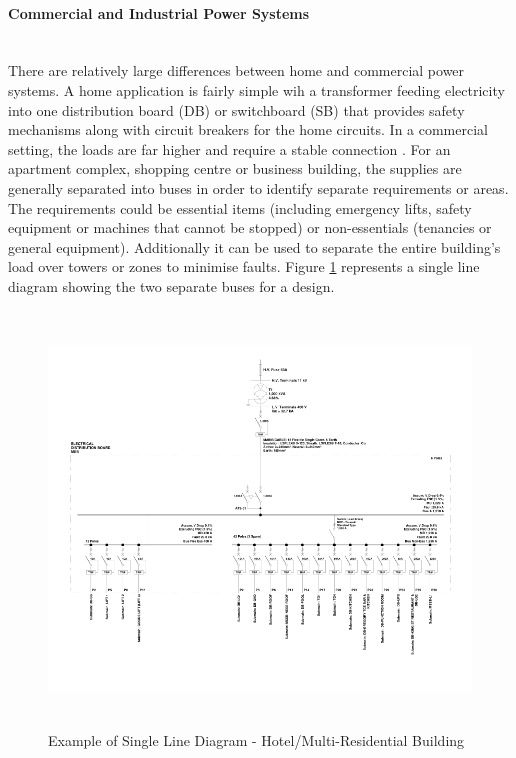 \paragraph{Commercial and Industrial Power Systems}
~\\
There are relatively large differences between home and commercial power systems. A home application is fairly simple wih a transformer feeding electricity into one distribution board (DB) or switchboard (SB) that provides safety mechanisms along with circuit breakers for the home circuits. In a commercial setting, the loads are far higher and require a stable connection \cite{Baran2003}. For an apartment complex, shopping centre or business building, the supplies are generally separated into buses in order to identify separate requirements or areas. The requirements could be essential items (including emergency lifts, safety equipment or machines that cannot be stopped) or non-essentials (tenancies or general equipment). Additionally it can be used to separate the entire building's load over towers or zones to minimise faults. Figure \ref{fig:SLD} represents a single line diagram showing the two separate buses for a design. 

\begin{figure}[H]
	\hfill\includegraphics[width = 160mm, height = 110mm]{images/PCad_SLD}\hspace*{\fill}
	\caption{Example of Single Line Diagram - Hotel/Multi-Residential Building}
	\label{fig:SLD}
\end{figure} 

